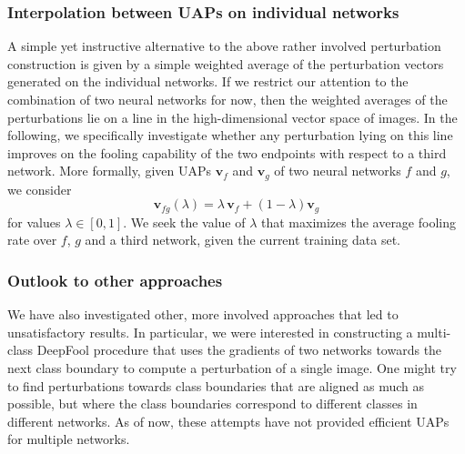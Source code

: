 \documentclass[runningheads]{llncs}
\begin{document}
\subsubsection{Interpolation between UAPs on individual networks}
A simple yet instructive alternative to the above rather involved perturbation construction is given by a simple weighted average of the perturbation vectors generated on the individual networks. If we restrict our attention to the combination of two neural networks for now, then the weighted averages of the perturbations lie on a line in the high-dimensional vector space of images. In the following, we specifically investigate whether any perturbation lying on this line improves on the fooling capability of the two endpoints with respect to a third network.
More formally, given UAPs \(\mathbf{v}_f\) and \(\mathbf{v}_g\) of two neural networks $f$ and $g$, we consider \begin{equation}\label{eq:interp}
\mathbf{v}_{fg}\left(\lambda\right)=\lambda\,\mathbf{v}_f+\left(1-\lambda\right)\mathbf{v}_g
\end{equation}	
for values \(\lambda\in\left[0,1\right]\). We seek the value of $\lambda$ that maximizes the average fooling rate over $f$, $g$ and a third network, given the current training data set.


\subsubsection{Outlook to other approaches}
We have also investigated other, more involved approaches that led to unsatisfactory results. In particular, we were interested in constructing a multi-class DeepFool procedure that uses the gradients of two networks towards the next class boundary to compute a perturbation of a single image. One might try to find perturbations towards class boundaries that are aligned as much as possible, but where the class boundaries correspond to different classes in different networks. As of now, these attempts have not provided efficient UAPs for multiple networks.
\end{document}
